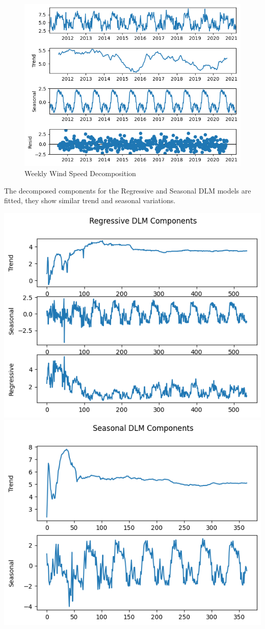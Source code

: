 \documentclass[a4paper,12pt]{article}
\begin{document}
\begin{figure}[htbp]
\centering
\includegraphics[width=1.0\textwidth]{./images/tiru/weeklyDecomp.png}
Weekly Wind Speed Decomposition
\end{figure}

The decomposed components for the Regressive and Seasonal DLM models are fitted, they show similar trend and seasonal variations.

\begin{center}
\includegraphics[width=0.45\linewidth]{./images/tiru/weeklyRegDecomp.png}
\includegraphics[width=0.45\linewidth]{./images/tiru/weeklySeasDecomp.png}
\end{center}
\end{document}
